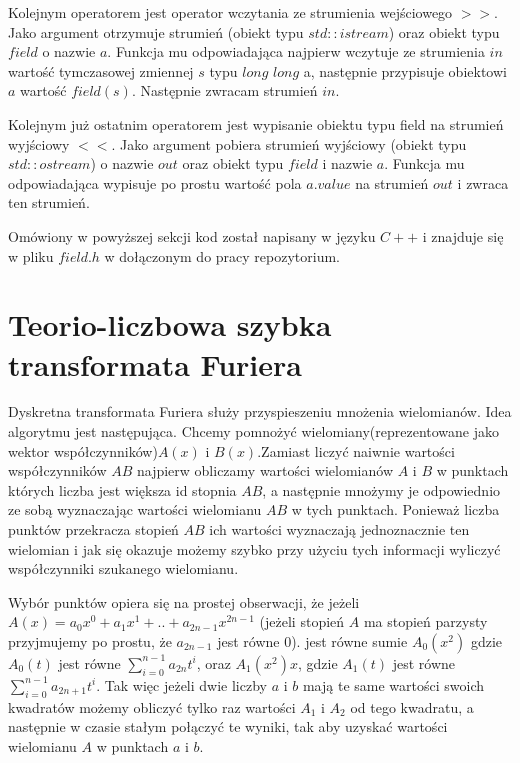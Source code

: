 \documentclass{article}
\begin{document}
Kolejnym operatorem jest operator wczytania ze strumienia wejściowego $>>$.
Jako argument otrzymuje strumień (obiekt typu
$std::istream$) oraz obiekt typu $field$ o nazwie $a$.
Funkcja mu odpowiadająca najpierw wczytuje ze strumienia $in$ wartość tymczasowej zmiennej $s$ typu $long$ $long$
a, następnie przypisuje obiektowi $a$ wartość $field(s)$. Następnie zwracam strumień $in$.

Kolejnym już ostatnim operatorem jest wypisanie obiektu typu field na strumień wyjściowy
$<<$. Jako argument pobiera strumień wyjściowy (obiekt typu $std::ostream$) o nazwie $out$ oraz 
obiekt typu $field$ i nazwie $a$. Funkcja mu odpowiadająca wypisuje po prostu wartość pola 
$a.value$ na strumień $out$ i zwraca ten strumień. 

Omówiony w powyższej sekcji kod został napisany w języku $C++$ i znajduje się w 
pliku $field.h$ w dołączonym do pracy repozytorium.







\section{Teorio-liczbowa szybka transformata Furiera}

Dyskretna transformata Furiera służy przyspieszeniu mnożenia wielomianów. Idea algorytmu jest następująca. Chcemy pomnożyć wielomiany(reprezentowane jako wektor współczynników)$A(x)$ i $B(x).$Zamiast liczyć naiwnie wartości współczynników $AB$ najpierw obliczamy wartości wielomianów $A$ i $B$ w punktach których liczba jest większa id stopnia $AB$, 
a następnie mnożymy je odpowiednio ze sobą  wyznaczając wartości wielomianu $AB$ w tych punktach. Ponieważ liczba punktów
przekracza stopień $AB$ ich wartości wyznaczają jednoznacznie ten wielomian i jak się okazuje możemy szybko przy użyciu tych informacji wyliczyć współczynniki szukanego wielomianu.

Wybór punktów opiera się na prostej obserwacji, że jeżeli $A(x) = a_0x^0+a_1x^1+..+a_{2n-1}x^{2n-1}$
(jeżeli stopień $A$ ma stopień parzysty przyjmujemy po prostu, że $a_{2n-1}$ jest równe $0$). jest równe
sumie $A_0(x^2)$ gdzie $A_0(t)$ jest równe $\sum_{i=0}^{n-1}a_{2n}t^{i}$, oraz 
$A_1(x^2)x$, gdzie $A_1(t)$ jest równe $\sum_{i=0}^{n-1}a_{2n+1}t^{i}$. Tak więc jeżeli dwie
liczby $a$ i $b$ mają te same wartości swoich kwadratów możemy obliczyć tylko raz wartości $A_1$ i $A_2$
od tego kwadratu, a następnie w czasie stałym połączyć te wyniki, tak aby uzyskać wartości 
wielomianu $A$ w punktach $a$ i $b$. 
\end{document}
